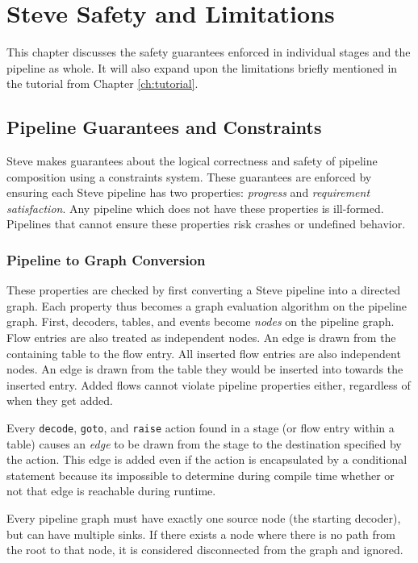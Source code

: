 \chapter{Steve Safety and Limitations} \label{ch:limits}

This chapter discusses the safety guarantees enforced in individual stages
and the pipeline as whole. It will also expand upon the limitations
briefly mentioned in the tutorial from Chapter \ref{ch:tutorial}.

\section{Pipeline Guarantees and Constraints} \label{guide:pipeline_checking}

Steve makes guarantees about the logical correctness and safety of pipeline 
composition using a constraints system. These guarantees are enforced by ensuring each Steve pipeline has two  properties: \textit{progress} and \textit{requirement satisfaction}. Any 
pipeline which does not have these properties is ill-formed. 
Pipelines that cannot ensure these properties risk crashes or undefined behavior.

\subsection{Pipeline to Graph Conversion} \label{guide:pipeline_graph}

These properties are checked by first converting a Steve pipeline into a directed graph. Each property thus becomes a graph evaluation algorithm on the pipeline graph. 
First, decoders, tables, and events become \textit{nodes} on the pipeline graph.
Flow entries are also treated as independent nodes. 
An edge is drawn from the containing table to the flow entry. 
All inserted flow entries are also independent nodes.
An edge is drawn from the table they would be inserted into towards the inserted
entry.
Added flows cannot violate pipeline properties either, regardless of when they get 
added.

Every \texttt{decode}, \texttt{goto}, and \texttt{raise} action found in a stage 
(or flow entry within a table) causes an \textit{edge} to be drawn from the stage 
to the destination specified by the action. 
This edge is added even if the action is encapsulated by a conditional statement 
because its impossible to determine during compile time whether or not that edge 
is reachable during runtime.

Every pipeline graph must have exactly one source node (the starting decoder), but can have multiple sinks.
If there exists a node where there is no path from the root to that node, it is
considered disconnected from the graph and ignored.

